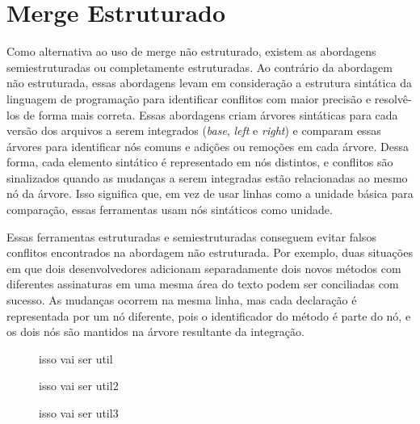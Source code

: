 \section{Merge Estruturado}
Como alternativa ao uso de merge não estruturado, existem as abordagens
semiestruturadas ou completamente estruturadas. Ao contrário da abordagem não
estruturada, essas abordagens levam em consideração a estrutura sintática da
linguagem de programação para identificar conflitos com maior precisão e resolvê-los de
forma mais correta. Essas abordagens criam árvores sintáticas para
cada versão dos arquivos a serem integrados (\emph{base}, \emph{left} e \emph{right})
e comparam essas árvores para identificar nós comuns
e adições ou remoções em cada árvore. Dessa forma, cada elemento sintático
é representado em nós distintos, e conflitos são sinalizados quando as mudanças
a serem integradas estão relacionadas ao mesmo nó da árvore. Isso significa
que, em vez de usar linhas como a unidade básica para comparação, essas ferramentas usam
nós sintáticos como unidade.

Essas ferramentas estruturadas e semiestruturadas conseguem evitar falsos conflitos
encontrados na abordagem não estruturada. Por exemplo, duas situações em
que dois desenvolvedores adicionam separadamente dois novos métodos com diferentes
assinaturas em uma mesma área do texto podem ser conciliadas com sucesso.
As mudanças ocorrem na mesma linha, mas cada declaração é representada por
um nó diferente, pois o identificador do método é parte do nó,
e os dois nós são mantidos na árvore resultante da integração.

\begin{figure}[ht]
\begin{center}
    
\end{center}
\caption[]{isso vai ser util}\label{base_example}
\end{figure}
\begin{figure}[ht]
\begin{center}
    
\end{center}
\caption[]{isso vai ser util2}\label{left_example}
\end{figure}
\begin{figure}[ht]
\begin{center}
    
\end{center}
\caption[]{isso vai ser util3}\label{right_example}
\end{figure}

